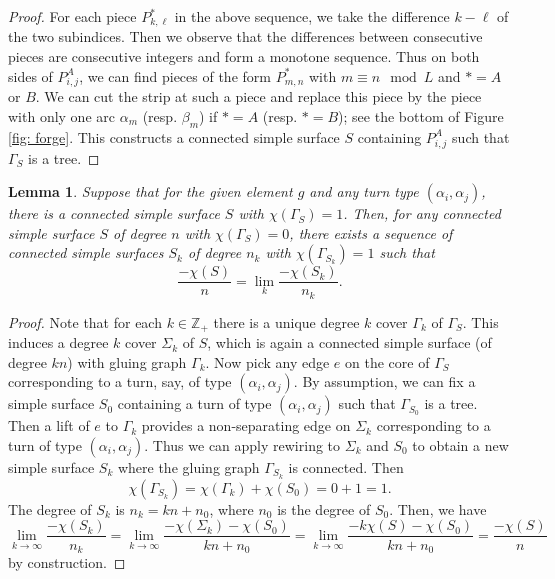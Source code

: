 \documentclass{amsart}
\newtheorem{lemma}[theorem]{Lemma}
\theoremstyle{definition}
\numberwithin{equation}{section}
\theoremstyle{theorem}
\theoremstyle{remark}
\def\Z{\mathbb Z}
\begin{document}
\begin{proof}
		For each piece $P^*_{k,\ell}$ in the above sequence, we take the difference $k-\ell$ of the two subindices. 
		Then we observe that the differences between consecutive pieces are consecutive integers and form a monotone sequence.
		Thus on both sides of $P^A_{i,j}$, we can find pieces of the form $P^*_{m,n}$ with $m\equiv n\mod L$ and $*=A$ or $B$. 
		We can cut the strip at such a piece and replace this piece by the piece with only one arc $\alpha_m$ (resp. $\beta_m$) if $*=A$ (resp. $*=B$); 
		see the bottom of Figure \ref{fig: forge}. This constructs a connected simple surface $S$ containing $P^A_{i,j}$ such that $\Gamma_S$ is a tree.
	\end{proof}
	
	\begin{lemma}\label{lemma: approximation}
		Suppose that for the given element $g$ and any turn type $(\alpha_i,\alpha_j)$, there is a connected simple surface $S$ with $\chi(\Gamma_S)=1$.
		Then, for any connected simple surface $S$ of degree $n$ with $\chi(\Gamma_S)=0$, there exists a sequence of connected simple surfaces $S_k$ of degree $n_k$ with $\chi(\Gamma_{S_k})=1$ such that 
		$$\frac{-\chi(S)}{n}=\lim_k \frac{-\chi(S_k)}{n_k}.$$
	\end{lemma}
	\begin{proof}
		Note that for each $k\in\Z_+$ there is a unique degree $k$ cover $\Gamma_{k}$ of $\Gamma_S$. This induces a degree $k$ cover $\Sigma_k$ of $S$, which is again a connected simple surface (of degree $kn$) with gluing graph $\Gamma_k$.
		Now pick any edge $e$ on the core of $\Gamma_S$ corresponding to a turn, say, of type $(\alpha_i,\alpha_j)$.
		By assumption, we can fix a simple surface $S_0$ containing a turn of type $(\alpha_i,\alpha_j)$ such that $\Gamma_{S_0}$ is a tree. Then a lift of $e$ to $\Gamma_k$ provides a non-separating edge on $\Sigma_k$ corresponding to a turn of type $(\alpha_i,\alpha_j)$. Thus we can apply rewiring to $\Sigma_k$ and $S_0$ to obtain a new simple surface $S_k$ where the gluing graph $\Gamma_{S_k}$ is connected. Then $$\chi(\Gamma_{S_k})=\chi(\Gamma_k)+\chi(S_0)=0+1=1.$$
		The degree of $S_k$ is $n_k=kn+n_0$, where $n_0$ is the degree of $S_0$.
		Then, we have
		$$\lim_{k\to\infty} \frac{-\chi(S_k)}{n_k}=\lim_{k\to\infty}\frac{-\chi(\Sigma_k)-\chi(S_0)}{kn+n_0}=\lim_{k\to \infty}\frac{-k\chi(S)-\chi(S_0)}{kn+n_0}= \frac{-\chi(S)}{n}$$
		by construction.
	\end{proof}
	
\end{document}
